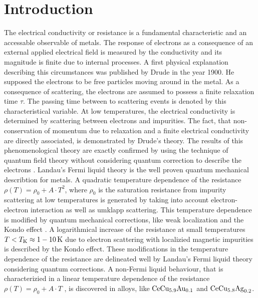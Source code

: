 %
%
\chapter{Introduction}
\label{ch:introduction}
%
%
The electrical conductivity or resistance is a fundamental characteristic and an accessable observable of metals.
The response of electrons as a consequence of an external applied electrical field is measured by the conductivity and its magnitude is finite due to internal processes.
A first physical explanation describing this circumstances was published by Drude \cite{Drude} in the year 1900.
He supposed the electrons to be free particles moving around in the metal.
As a consequence of scattering, the electrons are assumed to possess a finite relaxation time $\tau$.
The passing time between to scattering events is denoted by this characteristical variable.
At low temperatures, the electrical conductivity is determined by scattering between electrons and impurities.
The fact, that non-conservation of momentum due to relaxation and a finite electrical conductivity are directly associated, is demonstrated by Drude's theory.
The results of this phenomenological theory are exactly confirmed by using the technique of quantum field theory without considering quantum correction to describe the electrons \cite{Bruus&Flensberg}.
Landau's Fermi liquid theory is the well proven quantum mechanical describtion for metals.
A quadratic temperature dependence of the resistance $\rho(T) = \rho_{0} + A \cdot T^{2}$, where $\rho_{0}$ is the saturation resistance from impurity scattering at low temperatures \cite{Bader,Pal} is generated by taking into account electron-electron interaction as well as umklapp scattering.
This temperature dependence is modified by quantum mechanical corrections, like weak localization \cite{Altshuler} and the Kondo effect \cite{Kondo}.
A logarithmical increase of the resistance at small temperatures $T < T_{\mathrm{K}} \approx 1-10\,\mathrm{K}$ \cite{Kouwenhoven&Glazman} due to electron scattering with localizied magnetic impurities is described by the Kondo effect.
These modifications in the temperature dependence of the resistance are delineated well by Landau's Fermi liquid theory considering quantum corrections.
A non-Fermi liquid behaviour, that is characterizied in a linear temperature dependence of the resistance $\rho(T) = \rho_{0} + A \cdot T$ \cite{Loehneysen}, is  discovered in alloys, like $\mathrm{CeCu}_{5.9}\mathrm{Au}_{0.1}$ and $\mathrm{CeCu}_{5.8}\mathrm{Ag}_{0.2}$.

